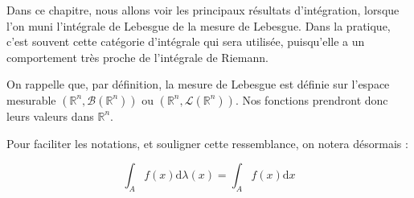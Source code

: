 \documentclass[../integ-proba.tex]{subfiles}
\begin{document}
Dans ce chapitre, nous allons voir les principaux résultats d'intégration, lorsque l'on muni l'intégrale de Lebesgue de la mesure de Lebesgue.
Dans la pratique, c'est souvent cette catégorie d'intégrale qui sera utilisée, puisqu'elle a un comportement très proche de l'intégrale de Riemann.

On rappelle que, par définition, la mesure de Lebesgue est définie sur l'espace mesurable $\left(\mathbb{R}^n, \mathcal{B}(\mathbb{R}^n)\right)$ ou $\left(\mathbb{R}^n, \mathcal{L}(\mathbb{R}^n)\right)$.
Nos fonctions prendront donc leurs valeurs dans $\mathbb{R}^n$.

Pour faciliter les notations, et souligner cette ressemblance, on notera désormais :

$$
\int_Af(x)\text{d}\lambda(x) = \int_Af(x)\text{d}x
$$

\end{document}

